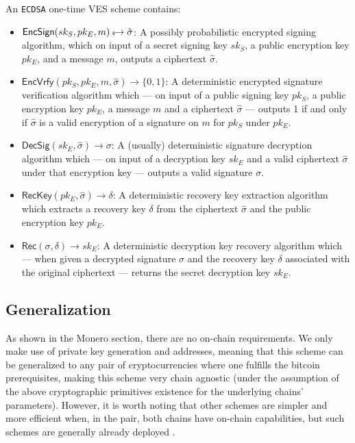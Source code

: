 \documentclass{llncs}
\newcommand{\EncSign}{\textsf{EncSign}}
\newcommand{\EncVer}{\textsf{EncVrfy}}
\newcommand{\DecSig}{\textsf{DecSig}}
\newcommand{\Rec}{\textsf{Rec}}
\newcommand{\RecKey}{\textsf{RecKey}}
\newcommand{\hatsigma}{\hat{\sigma}}
\newcommand{\skSign}{sk_S}
\newcommand{\pkSign}{pk_S}
\newcommand{\skEnc}{sk_E}
\newcommand{\pkEnc}{pk_E}
\newcommand{\rec}{\delta}
\newcommand{\bin}{\{0,1\}}
\begin{document}
\begin{definition}
    An \texttt{ECDSA} one-time VES scheme contains:
\begin{itemize}
    \item $\EncSign(\skSign, \pkEnc, m) \hskip2.3pt{\mbox{\tiny${\$}$\normalsize}}\!\!\rightarrow \hatsigma$: A possibly probabilistic encrypted signing algorithm, which on input of a secret signing key $\skSign$, a public encryption key $\pkEnc$, and a message $m$, outputs a ciphertext $\hatsigma$.
    \item $\EncVer(\pkSign, \pkEnc, m, \hatsigma) \rightarrow \bin$: A deterministic encrypted signature verification algorithm which --- on input of a public signing key $\pkSign$, a public encryption key $\pkEnc$, a message $m$ and a ciphertext $\hatsigma$ --- outputs 1 if and only if $\hatsigma$ is a valid encryption of a signature on $m$ for $\pkSign$ under $\pkEnc$.
    \item $\DecSig(\skEnc, \hatsigma) \rightarrow \sigma$: A (usually) deterministic signature decryption algorithm which --- on input of a decryption key $\skEnc$ and a valid ciphertext $\hatsigma$ under that encryption key --- outputs a valid signature $\sigma$.
    \item $\RecKey(\pkEnc, \hatsigma) \rightarrow \delta$: A deterministic recovery key extraction algorithm which extracts a recovery key $\delta$ from the ciphertext $\hatsigma$ and the public encryption key $\pkEnc$.
    \item $\Rec(\sigma,\rec) \rightarrow \skEnc$: A deterministic decryption key recovery algorithm which --- when given a decrypted signature $\sigma$ and the recovery key $\rec$ associated with the original ciphertext --- returns the secret decryption key $\skEnc$.
\end{itemize}
\end{definition}

\subsection{Generalization}
As shown in the Monero section, there are no on-chain requirements. We only make use of private key generation and addresses, meaning that this scheme can be generalized to any pair of cryptocurrencies where one fulfills the bitcoin prerequisites, making this scheme very chain agnostic (under the assumption of the above cryptographic primitives existence for the underlying chains' parameters). However, it is worth noting that other schemes are simpler and more efficient when, in the pair, both
chains have on-chain capabilities, but such schemes are generally already deployed \cite{atomic-swap, scriptless-atomic-swap}.
\end{document}
